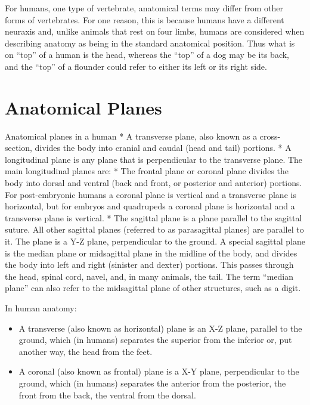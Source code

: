 For humans, one type of vertebrate, anatomical terms may differ from other forms of vertebrates. For one reason, this is because humans have a different neuraxis and, unlike animals that rest on four limbs, humans are considered when describing anatomy as being in the standard anatomical position. Thus what is on ``top'' of a human is the head, whereas the ``top'' of a dog may be its back, and the ``top'' of a flounder could refer to either its left or its right side.

\hypertarget{anatomical-planes}{%
\section{Anatomical Planes}\label{anatomical-planes}}

Anatomical planes in a human
* A transverse plane, also known as a cross-section, divides the body into cranial and caudal (head and tail) portions.
* A longitudinal plane is any plane that is perpendicular to the transverse plane. The main longitudinal planes are:
* The frontal plane or coronal plane divides the body into dorsal and ventral (back and front, or posterior and anterior) portions. For post-embryonic humans a coronal plane is vertical and a transverse plane is horizontal, but for embryos and quadrupeds a coronal plane is horizontal and a transverse plane is vertical.
* The sagittal plane is a plane parallel to the sagittal suture. All other sagittal planes (referred to as parasagittal planes) are parallel to it. The plane is a Y-Z plane, perpendicular to the ground.
A special sagittal plane is the median plane or midsagittal plane in the midline of the body, and divides the body into left and right (sinister and dexter) portions. This passes through the head, spinal cord, navel, and, in many animals, the tail. The term ``median plane'' can also refer to the midsagittal plane of other structures, such as a digit.

In human anatomy:

\begin{itemize}
\tightlist
\item
  A transverse (also known as horizontal) plane is an X-Z plane, parallel to the ground, which (in humans) separates the superior from the inferior or, put another way, the head from the feet.
\item
  A coronal (also known as frontal) plane is a X-Y plane, perpendicular to the ground, which (in humans) separates the anterior from the posterior, the front from the back, the ventral from the dorsal.
\end{itemize}

